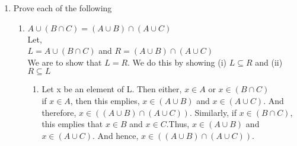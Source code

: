 \documentclass[a4paper,12pt]{article}
\begin{document}
\begin{enumerate}
\begin{enumerate}
    \end{enumerate}

\pagebreak
\item 
    Prove each of the following
    \begin{enumerate}
        \item
            $A \cup (B \cap C) = (A \cup B) \cap (A \cup C)$ \\ 
            Let, \\ $L = A \cup (B \cap C)$ and $R = (A \cup B) \cap (A \cup C)$ \\
            We are to show that $L = R$. We do this by showing (i) $L \subseteq R$ and (ii) $R \subseteq L$
            \begin{enumerate}
                \item
                    Let x be an element of L. Then either, $x \in A$ or $x \in (B \cap C)$\\
                    if $x \in A$, then this emplies, $x \in (A \cup B)$ and $x \in (A \cup C)$. And therefore, $x \in ((A \cup B) \cap (A \cup C))$.
                    Similarly, if $x \in (B \cap C)$, this emplies that $x \in B$ and $x \in C$.Thus, $x \in (A \cup B)$ and $x \in (A \cup C)$. And hence,  $x \in ((A \cup B) \cap (A \cup C))$.


\end{enumerate}
\end{enumerate}
\end{enumerate}
\end{document}
